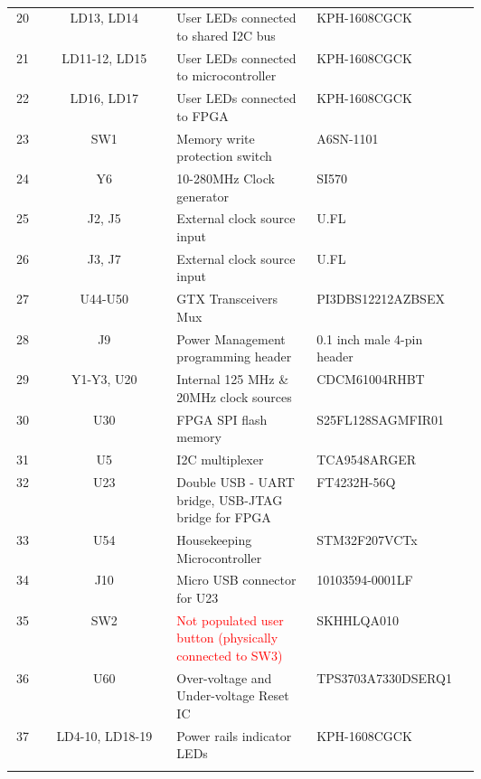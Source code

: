 \documentclass[12pt,oneside,a4]{article}
\begin{document}
\begin{longtable}[htbp]{@{}ccp{0.3\linewidth}p{0.3\linewidth}c@{}}
20 & LD13, LD14 & User LEDs connected to shared I2C bus & KPH-1608CGCK &  \\
21 & LD11-12, LD15 & User LEDs connected to microcontroller &  KPH-1608CGCK  &  \\
22 & LD16, LD17    & User LEDs connected to FPGA &  KPH-1608CGCK     &  \\
23 & SW1 & Memory write protection switch  & A6SN-1101 &  \\
24 & Y6  & 10-280MHz Clock generator   & SI570  &  \\
25 & J2, J5    & External clock source input & U.FL      &  \\
26 & J3, J7 &  External clock source input &   U.FL       &  \\
27 & U44-U50    & GTX Transceivers Mux & PI3DBS12212AZBSEX  &  \\
28 & J9  & Power Management programming header & 0.1 inch male 4-pin header &  \\
29 & Y1-Y3, U20 & Internal 125 MHz \& 20MHz clock sources & CDCM61004RHBT &  \\
30 & U30 &  FPGA SPI flash memory  & S25FL128SAGMFIR01 &  \\
31 & U5  &  I2C multiplexer    & TCA9548ARGER   &  \\
32 & U23 &  Double USB - UART bridge, USB-JTAG bridge for FPGA & FT4232H-56Q   &  \\
33 & U54 & Housekeeping Microcontroller  & STM32F207VCTx  &  \\
34 & J10 & Micro USB connector for U23  & 10103594-0001LF  &  \\
35 & SW2 & \textcolor{red}{Not populated user button (physically connected to SW3)}  & SKHHLQA010  &  \\
36 & U60 & Over-voltage and Under-voltage Reset IC & TPS3703A7330DSERQ1 &  \\
37 & LD4-10, LD18-19 & Power rails indicator LEDs & KPH-1608CGCK &  \\ \bottomrule

\caption{}
\label{tab:my-table}
\end{longtable}
\end{document}

